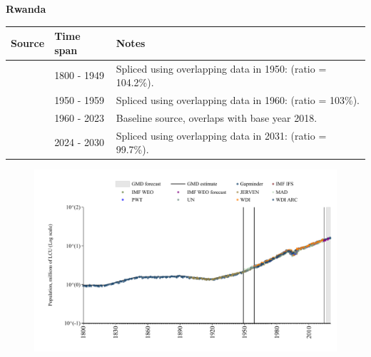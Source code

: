 \documentclass[12pt,a4paper,landscape]{article}
\begin{document}
\begin{adjustbox}{max totalsize={\paperwidth}{\paperheight},center}
\begin{minipage}[t][\textheight][t]{\textwidth}
\vspace*{0.5cm}
{}
\begin{center}
{\Large\bfseries Rwanda}
\end{center}
\vspace{0.5cm}
\begin{table}[H]
\centering
\small
\begin{tabular}{|l|l|l|}
\hline
\textbf{Source} & \textbf{Time span} & \textbf{Notes} \\
\hline
\rowcolor{white}\cite{Gapminder}& 1800 - 1949 &Spliced using overlapping data in 1950: (ratio = 104.2\%).\\
\rowcolor{lightgray}\cite{IMF_IFS}& 1950 - 1959 &Spliced using overlapping data in 1960: (ratio = 103\%).\\
\rowcolor{white}\cite{WDI}& 1960 - 2023 &Baseline source, overlaps with base year 2018.\\
\rowcolor{lightgray}\cite{Gapminder}& 2024 - 2030 &Spliced using overlapping data in 2031: (ratio = 99.7\%).\\
\hline
\end{tabular}
\end{table}
\begin{figure}[H]
\centering
\includegraphics[width=\textwidth,height=0.6\textheight,keepaspectratio]{graphs/RWA_pop.pdf}
\end{figure}
\end{minipage}
\end{adjustbox}
\end{document}
